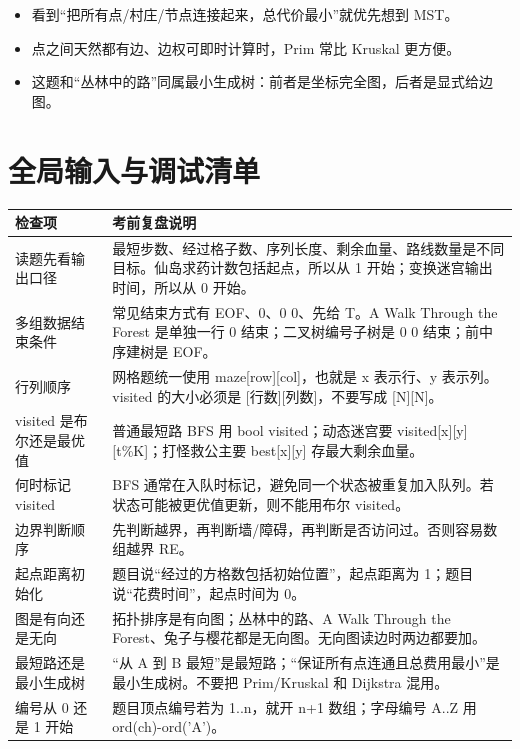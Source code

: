\documentclass[10pt,a4paper,fontset=none]{ctexart}
\begin{document}
\begin{notebox}
\begin{itemize}
  \item 看到“把所有点/村庄/节点连接起来，总代价最小”就优先想到 MST。
  \item 点之间天然都有边、边权可即时计算时，Prim 常比 Kruskal 更方便。
  \item 这题和“丛林中的路”同属最小生成树：前者是坐标完全图，后者是显式给边图。
\end{itemize}
\end{notebox}



\section{全局输入与调试清单}
\begin{longtable}{p{}p{}}
\toprule
\textbf{检查项} & \textbf{考前复盘说明} \\
\midrule
读题先看输出口径 & 最短步数、经过格子数、序列长度、剩余血量、路线数量是不同目标。仙岛求药计数包括起点，所以从 1 开始；变换迷宫输出时间，所以从 0 开始。\\
多组数据结束条件 & 常见结束方式有 EOF、0、0 0、先给 T。A Walk Through the Forest 是单独一行 0 结束；二叉树编号子树是 0 0 结束；前中序建树是 EOF。\\
行列顺序 & 网格题统一使用 maze[row][col]，也就是 x 表示行、y 表示列。visited 的大小必须是 [行数][列数]，不要写成 [N][N]。\\
visited 是布尔还是最优值 & 普通最短路 BFS 用 bool visited；动态迷宫要 visited[x][y][t\%K]；打怪救公主要 best[x][y] 存最大剩余血量。\\
何时标记 visited & BFS 通常在入队时标记，避免同一个状态被重复加入队列。若状态可能被更优值更新，则不能用布尔 visited。\\
边界判断顺序 & 先判断越界，再判断墙/障碍，再判断是否访问过。否则容易数组越界 RE。\\
起点距离初始化 & 题目说“经过的方格数包括初始位置”，起点距离为 1；题目说“花费时间”，起点时间为 0。\\
图是有向还是无向 & 拓扑排序是有向图；丛林中的路、A Walk Through the Forest、兔子与樱花都是无向图。无向图读边时两边都要加。\\
最短路还是最小生成树 & “从 A 到 B 最短”是最短路；“保证所有点连通且总费用最小”是最小生成树。不要把 Prim/Kruskal 和 Dijkstra 混用。\\
编号从 0 还是 1 开始 & 题目顶点编号若为 1..n，就开 n+1 数组；字母编号 A..Z 用 ord(ch)-ord('A')。\\

\end{longtable}
\end{document}

